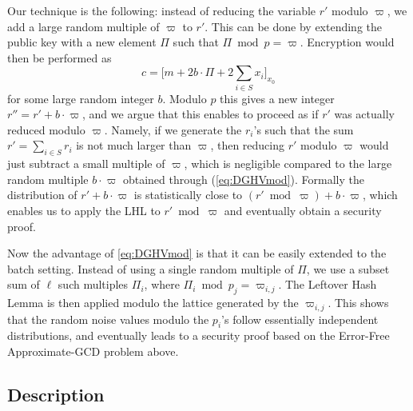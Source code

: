 \documentclass{llncs}
\begin{document}
Our technique is the following: instead of reducing the variable $r'$
modulo $\varpi$, we add a large random multiple of $\varpi$ to $r'$. This
can be done by extending the public key with a new element $\varPi$ such
that $\varPi \bmod p=\varpi$. Encryption would then be performed as
\begin{equation}
\label{eq:DGHVmod}
c = \Big[m + 2b \cdot \varPi+
  2\sum\limits_{i\in S} x_i\Big]_{x_0}
\end{equation}
for some large random integer $b$. Modulo $p$ this gives a new integer
$r''=r' + b \cdot \varpi$, and we argue that this enables to proceed as if
$r'$ was actually reduced modulo $\varpi$. Namely, if we generate the
$r_i$'s such that the sum $r'=\sum_{i \in S} r_i$ is not much larger than
$\varpi$, then reducing $r'$ modulo $\varpi$ would just subtract a
small multiple of $\varpi$, which is negligible compared to the large
random multiple $b \cdot \varpi$ obtained through
(\ref{eq:DGHVmod}). Formally  the distribution of $r' + b 
\cdot \varpi$ is statistically close to $(r' \bmod \varpi) + b \cdot
\varpi$, which enables us to apply the LHL to $r' \bmod \varpi$ and
eventually obtain a security proof.

Now the advantage of \eqref{eq:DGHVmod} is that it can be easily extended
to the batch setting. Instead of using a single random multiple of
$\varPi$, we use a subset sum of $\ell$ such multiples $\varPi_i$, where
$\varPi_i \bmod p_j=\varpi_{i,j}$. The Leftover Hash Lemma is then
applied modulo the lattice generated by the $\varpi_{i,j}$. This shows
that the random noise values modulo the $p_i$'s follow essentially
independent distributions, and eventually leads to a security proof
based on the  Error-Free Approximate-GCD problem above.

\subsection{Description}\label{subsec:description}
\end{document}

